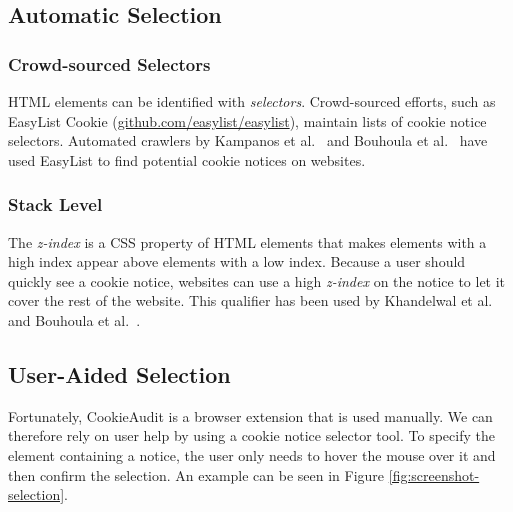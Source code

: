 \subsection{Automatic Selection}
\subsubsection{Crowd-sourced Selectors}
HTML elements can be identified with \emph{selectors}. 
Crowd-sourced efforts, such as EasyList Cookie (\href{https://github.com/easylist/easylist}{github.com/easylist/easylist}), maintain lists of cookie notice selectors.
Automated crawlers by Kampanos et al.~\cite{kampanos2021accept} and Bouhoula et al.~\cite{bouhoula2023automated} have used EasyList to find potential cookie notices on websites.

\subsubsection{Stack Level}
The \emph{z-index} is a CSS property of HTML elements that makes elements with a high index appear above elements with a low index. 
Because a user should quickly see a cookie notice, websites can use a high \emph{z-index} on the notice to let it cover the rest of the website. 
This qualifier has been used by Khandelwal et al.~\cite{khandelwal2023automated} and Bouhoula et al.~\cite{bouhoula2023automated}.

\subsection{User-Aided Selection}
Fortunately, CookieAudit is a browser extension that is used manually.
We can therefore rely on user help by using a cookie notice selector tool.
To specify the element containing a notice, the user only needs to hover the mouse over it and then confirm the selection. 
An example can be seen in Figure \ref{fig:screenshot-selection}.

